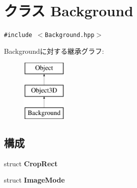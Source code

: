 \hypertarget{classm3g_1_1Background}{
\section{クラス Background}
\label{classm3g_1_1Background}
}
{\tt \#include $<$Background.hpp$>$}

Backgroundに対する継承グラフ:\begin{figure}[H]
\begin{center}
\leavevmode
\includegraphics[height=3cm]{classm3g_1_1Background}
\end{center}
\end{figure}
\subsection*{構成}
\begin{CompactItemize}
\item 
struct \textbf{CropRect}
\item 
struct \textbf{ImageMode}
\end{CompactItemize}
